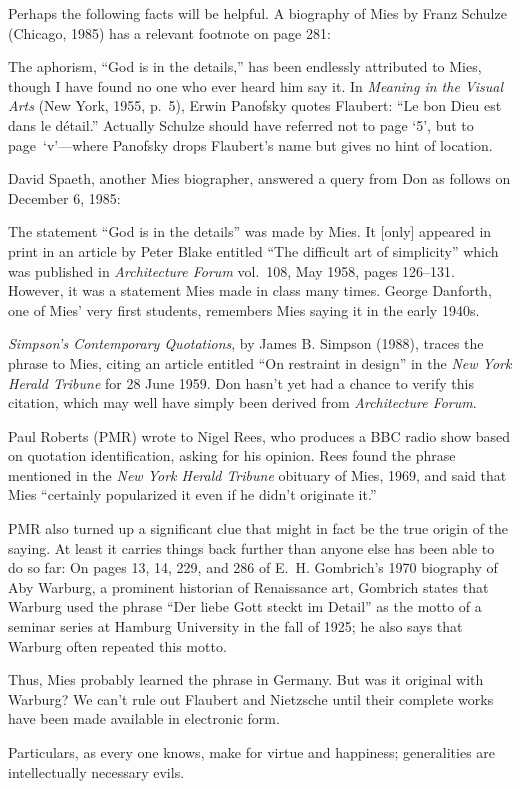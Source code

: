 Perhaps the following facts will be helpful. A biography of Mies by Franz
Schulze (Chicago, 1985) has a relevant footnote on page 281:

{\narrower\smallskip\noindent
The aphorism, ``God is in the details,'' has been endlessly attributed to
Mies, though I have found no one who ever heard him say it. In {\sl
Meaning in the Visual Arts\/} (New York, 1955, p.~5), Erwin Panofsky
quotes Flaubert: ``Le bon Dieu est dans le d\'etail.''
\smallskip}
\noindent Actually Schulze should have referred not to page `5', but to
page~`v'---where Panofsky drops Flaubert's name but gives no hint of location.

David Spaeth, another Mies biographer, answered a query from Don as follows
on December 6, 1985:

{\narrower\smallskip\noindent
The statement ``God is in the details'' was made by Mies. It [only]
appeared in print in an article by Peter Blake entitled ``The difficult
art of simplicity'' which was published in {\sl Architecture Forum\/}
vol.~108, May 1958, pages 126--131. However, it was a statement Mies made
in class many times. George Danforth, one of Mies' very first students,
remembers Mies saying it in the early 1940s.
\smallskip}

{\sl Simpson's Contemporary Quotations}, by James B. Simpson (1988),
traces the phrase to Mies, citing an article entitled ``On restraint
in design'' in the {\sl New York Herald Tribune\/} for 28 June 1959.
Don hasn't yet had a chance to verify this citation, which may well have
simply been derived from {\sl Architecture Forum}.

Paul Roberts (PMR) wrote to Nigel Rees, who produces a BBC radio show based
on quotation identification, asking for his opinion. Rees found the phrase
mentioned in the {\sl New York Herald Tribune\/} obituary of Mies, 1969,
and said that Mies ``certainly popularized it even if he didn't originate it.''

PMR also turned up a significant clue that might in fact be the true origin
of the saying. At least it carries things back further than anyone else has
been able to do so far: On pages 13, 14, 229, and 286 of E.~H. Gombrich's
1970 biography of Aby Warburg, a prominent historian of Renaissance art,
Gombrich states that Warburg used the phrase ``Der liebe Gott steckt im
Detail'' as the motto of a seminar series at Hamburg University in the
fall of 1925; he also says that Warburg often repeated this motto.

Thus, Mies probably learned the phrase in Germany. But was it original
with Warburg?  We can't rule out Flaubert and Nietzsche until their
complete works have been made available in electronic form.

{\narrower\smallskip\noindent
Particulars, as every one knows, make for virtue and happiness; generalities
are intellectually \hbox{necessary} evils.\par}

\bye
